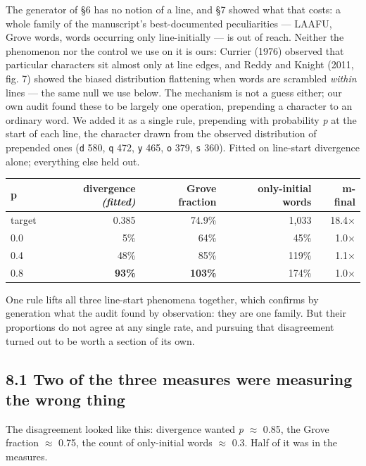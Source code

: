\documentclass[11pt,a4paper]{article}
\begin{document}
The generator of \S6 has no notion of a line, and \S7 showed what that costs: a whole family of the manuscript's best-documented peculiarities --- LAAFU, Grove words, words occurring only line-initially --- is out of reach. Neither the phenomenon nor the control we use on it is ours: Currier (1976) observed that particular characters sit almost only at line edges, and Reddy and Knight (2011, fig. 7) showed the biased distribution flattening when words are scrambled \emph{within} lines --- the same null we use below. The mechanism is not a guess either; our own audit found these to be largely one operation, prepending a character to an ordinary word. We added it as a single rule, prepending with probability \emph{p} at the start of each line, the character drawn from the observed distribution of prepended ones (\texttt{d} 580, \texttt{q} 472, \texttt{y} 465, \texttt{o} 379, \texttt{s} 360). Fitted on line-start divergence alone; everything else held out.


\begin{table}[htbp]\centering\small
\begin{tabular}{@{}lrrrr@{}}
\toprule
p & divergence \emph{(fitted)} & Grove fraction & only-initial words & m-final \\
\midrule
target & 0.385 & 74.9\% & 1,033 & 18.4$\times$ \\
0.0 & 5\% & 64\% & 45\% & 1.0$\times$ \\
0.4 & 48\% & 85\% & 119\% & 1.1$\times$ \\
0.8 & \textbf{93\%} & \textbf{103\%} & 174\% & 1.0$\times$ \\
\bottomrule
\end{tabular}
\end{table}


One rule lifts all three line-start phenomena together, which confirms by generation what the audit found by observation: they are one family. But their proportions do not agree at any single rate, and pursuing that disagreement turned out to be worth a section of its own.


\subsection*{8.1 Two of the three measures were measuring the wrong thing}


The disagreement looked like this: divergence wanted \emph{p} $\approx$ 0.85, the Grove fraction $\approx$ 0.75, the count of only-initial words $\approx$ 0.3. Half of it was in the measures.
\end{document}
